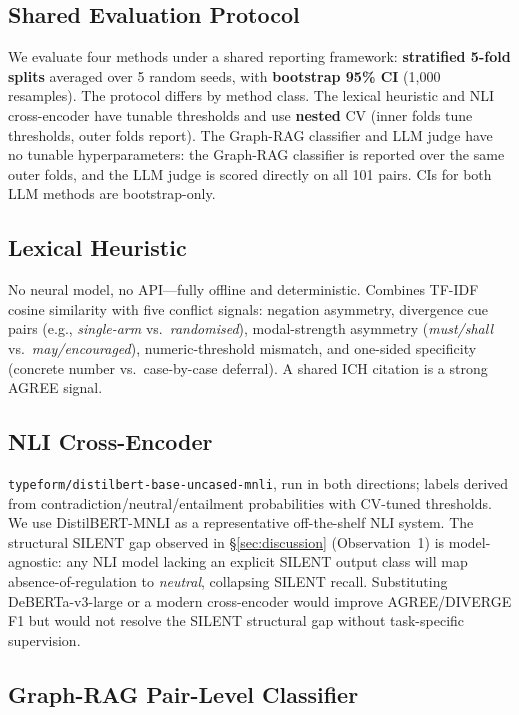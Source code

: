 \documentclass[manuscript]{acmart}
\begin{document}
\subsection{Shared Evaluation Protocol}

We evaluate four methods under a shared reporting framework:
\textbf{stratified 5-fold splits} averaged over 5 random seeds, with
\textbf{bootstrap 95\% CI} (1{,}000 resamples). The protocol differs by
method class. The lexical heuristic and NLI cross-encoder have tunable
thresholds and use \textbf{nested} CV (inner folds tune thresholds, outer folds
report). The Graph-RAG classifier and LLM judge have no tunable
hyperparameters: the Graph-RAG classifier is reported over the same outer
folds, and the LLM judge is scored directly on all 101 pairs. CIs for both LLM
methods are bootstrap-only.

\subsection{Lexical Heuristic}

No neural model, no API---fully offline and deterministic. Combines TF-IDF
cosine similarity with five conflict signals: negation asymmetry, divergence
cue pairs (e.g., \textit{single-arm} vs.\ \textit{randomised}), modal-strength
asymmetry (\textit{must/shall} vs.\ \textit{may/encouraged}),
numeric-threshold mismatch, and one-sided specificity (concrete number
vs.\ case-by-case deferral). A shared ICH citation is a strong AGREE signal.

\subsection{NLI Cross-Encoder}

\texttt{typeform/distilbert-base-uncased-mnli}, run in both directions; labels
derived from contradiction/neutral/entailment probabilities with CV-tuned
thresholds. We use DistilBERT-MNLI as a representative off-the-shelf NLI
system. The structural SILENT gap observed in \S\ref{sec:discussion} (Observation~1)
is model-agnostic: any NLI model lacking an explicit SILENT output class will
map absence-of-regulation to \textit{neutral}, collapsing SILENT recall.
Substituting DeBERTa-v3-large or a modern cross-encoder would improve
AGREE/DIVERGE F1 but would not resolve the SILENT structural gap without
task-specific supervision.

\subsection{Graph-RAG Pair-Level Classifier}
\end{document}
